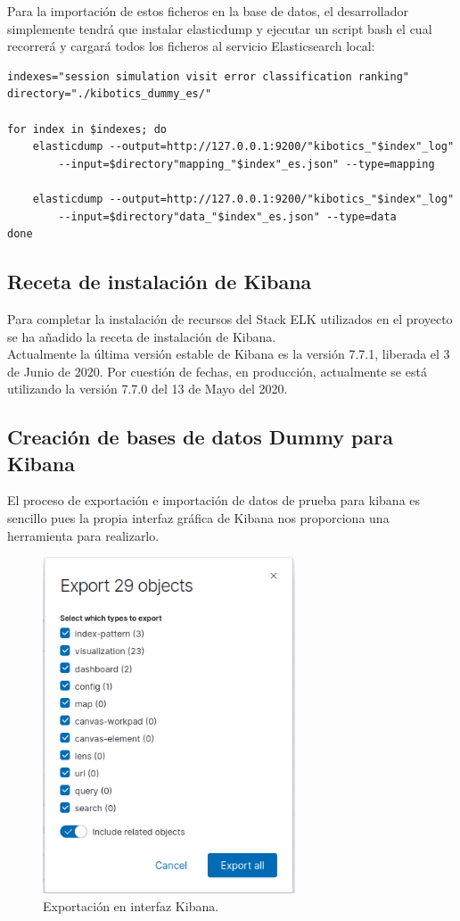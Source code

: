 \documentclass[11pt,a4paper]{book}
\begin{document}
				Para la importación de estos ficheros en la base de datos, el desarrollador simplemente tendrá que instalar elasticdump y ejecutar un script bash el cual recorrerá y cargará todos los ficheros al servicio Elasticsearch local:
				
				\begin{Verbatim}[tabsize=4]
indexes="session simulation visit error classification ranking"
directory="./kibotics_dummy_es/"

for index in $indexes; do
	elasticdump --output=http://127.0.0.1:9200/"kibotics_"$index"_log" 
		--input=$directory"mapping_"$index"_es.json" --type=mapping

	elasticdump --output=http://127.0.0.1:9200/"kibotics_"$index"_log" 
		--input=$directory"data_"$index"_es.json" --type=data
done
				\end{Verbatim}
			\subsection{Receta de instalación de Kibana}
			Para completar la instalación de recursos del Stack ELK utilizados en el proyecto se ha añadido la receta de instalación de Kibana.\\
			
			Actualmente la última versión estable de Kibana es la versión 7.7.1, liberada el 3 de Junio de 2020. Por cuestión de fechas, en producción, actualmente se está utilizando la versión 7.7.0 del 13 de Mayo del 2020.
			
			\subsection{Creación de bases de datos Dummy para Kibana}
			El proceso de exportación e importación de datos de prueba para kibana es sencillo pues la propia interfaz gráfica de Kibana nos proporciona una herramienta para realizarlo.
			
			\begin{figure}[H]
				\centering
				\includegraphics[width=7.5cm, keepaspectratio]{img/export_kibana.png}
				\caption{Exportación en interfaz Kibana.}
				\label{fig:export_kibana}
			\end{figure}
		
\end{document}
